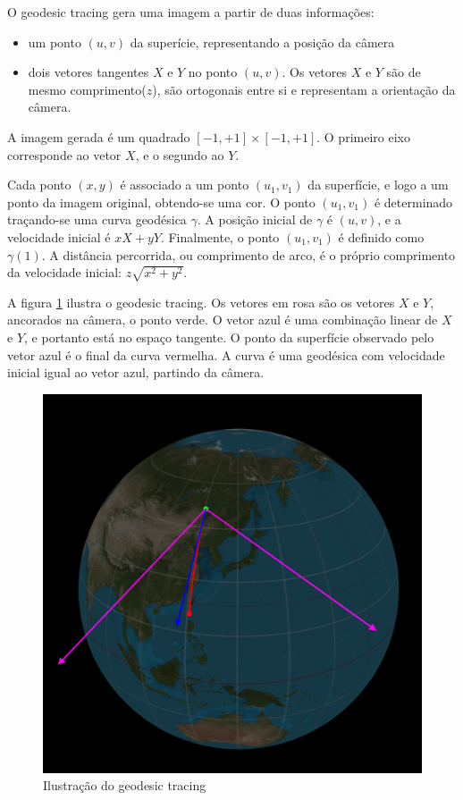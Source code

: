O geodesic tracing gera uma imagem a partir de duas informações:
\begin{itemize}
    \item um ponto $(u,v)$ da superície, representando a posição da câmera
    \item dois vetores tangentes $X$ e $Y$ no ponto $(u,v)$.
    Os vetores $X$ e $Y$ são de mesmo comprimento($z$), são ortogonais entre si e
    representam a orientação da câmera.
\end{itemize}

A imagem gerada é um quadrado $[-1, +1] \times [-1, +1]$.
O primeiro eixo corresponde ao vetor $X$, e o segundo ao $Y$.

Cada ponto $(x,y)$ é associado a um ponto $(u_1, v_1)$ da superfície,
e logo a um ponto da imagem original, obtendo-se uma cor.
O ponto $(u_1, v_1)$ é determinado traçando-se uma curva geodésica $\gamma$.
A posição inicial de $\gamma$ é $(u,v)$, e a velocidade inicial é $xX+yY$.
Finalmente, o ponto $(u_1, v_1)$ é definido como $\gamma(1)$.
A distância percorrida, ou comprimento de arco, é o próprio comprimento
da velocidade inicial: $z\sqrt{x^2+y^2}$.

A figura \ref{img:geotracing} ilustra o geodesic tracing.
Os vetores em rosa são os vetores $X$ e $Y$, ancorados na câmera, o ponto verde.
O vetor azul é uma combinação linear de $X$ e $Y$, e portanto está no espaço tangente.
O ponto da superfície observado pelo vetor azul é o final da curva vermelha.
A curva é uma geodésica com velocidade inicial igual ao vetor azul, partindo da câmera.

\begin{figure}[!ht]
    \includegraphics[width=\linewidth]{geotracing.png}
    \caption{Ilustração do geodesic tracing}
    \label{img:geotracing}
\end{figure}

